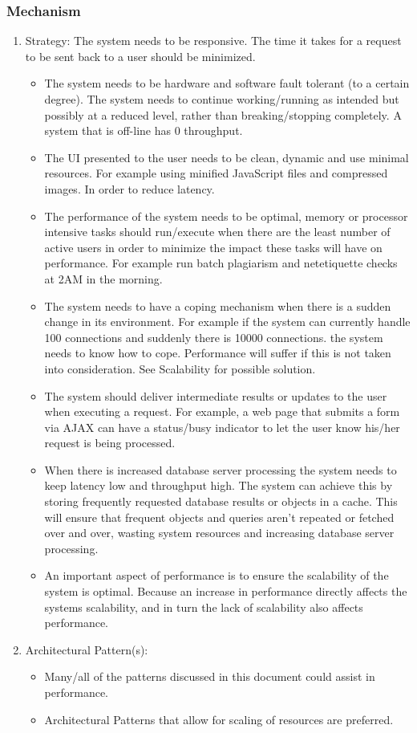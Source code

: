 	\subsubsection*{Mechanism}
		\begin{enumerate}
			\item Strategy:
			The system needs to be responsive. The time it takes for a request to be sent back to a user should be minimized.
			\begin{itemize}
				\item The system needs to be hardware and software fault tolerant (to a certain degree). The system needs to continue working/running as intended but possibly at a reduced level, rather than breaking/stopping completely. A system that is off-line has 0 throughput. 
				\item The UI presented to the user needs to be clean, dynamic and use minimal resources. For example using minified JavaScript files and compressed images. In order to reduce latency.
				\item The performance of the system needs to be optimal, memory or processor intensive tasks should run/execute when there are the least number of active users in order to minimize the impact these tasks will have on performance. For example run batch plagiarism and netetiquette checks at 2AM in the morning.
				\item The system needs to have a coping mechanism when there is a sudden change in its environment. For example if the system can currently handle 100 connections and suddenly there is 10000 connections. the system needs to know how to cope. Performance will suffer if this is not taken into consideration. See Scalability for possible solution.
				\item The system should deliver intermediate results or updates to the user when executing a request. For example, a web page that submits a form via AJAX can have a status/busy indicator to let the user know his/her request is being processed.
				\item When there is increased database server processing the system needs to keep latency low and throughput high. The system can achieve this by storing frequently requested database results or objects in a cache. This will ensure that frequent objects and queries aren't repeated or fetched over and over, wasting system resources and increasing database server processing.
				\item An important aspect of performance is to ensure the scalability of the system is optimal. Because an increase in performance directly affects the systems scalability, and in turn the lack of scalability also affects performance.
			 \end{itemize}
			\item Architectural Pattern(s):
			\begin{itemize}
			\item Many/all of the patterns discussed in this document could assist in performance.
			\item Architectural Patterns that allow for scaling of resources are preferred. 
			\end{itemize}
		\end{enumerate}
